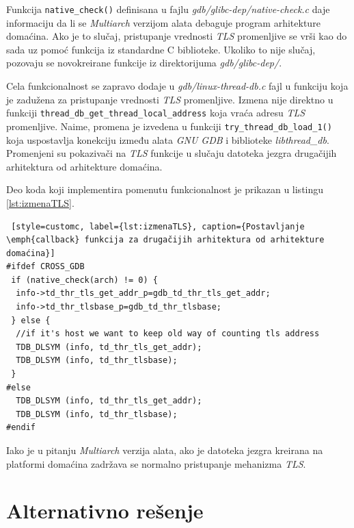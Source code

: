 \documentclass[12pt,oneside]{memoir}
\begin{document}
Funkcija \texttt{native\_check()} definisana u fajlu \emph{gdb/glibc-dep/native-check.c} daje informaciju da li se \emph{Multiarch} verzijom alata debaguje program arhitekture domaćina. Ako je to slučaj, pristupanje vrednosti \emph{TLS} promenljive se vrši kao do sada uz pomoć funkcija iz standardne C biblioteke. Ukoliko to nije slučaj, pozovaju se novokreirane funkcije iz direktorijuma \emph{gdb/glibc-dep/}.

Cela funkcionalnost se zapravo dodaje u \emph{gdb/linux-thread-db.c} fajl u funkciju koja je zadužena za pristupanje vrednosti \emph{TLS} promenljive. Izmena nije direktno u funkciji \texttt{thread\_db\_get\_thread\_local\_address} koja vraća adresu \emph{TLS} promenljive. Naime, promena je izvedena u funkciji \texttt{try\_thread\_db\_load\_1()} koja uspostavlja konekciju između alata \emph{GNU GDB} i biblioteke \emph{libthread\_db}. Promenjeni su pokazivači na \emph{TLS} funkcije u slučaju datoteka jezgra drugačijih arhitektura od arhitekture domaćina.

Deo koda koji implementira pomenutu funkcionalnost je prikazan u listingu \ref{lst:izmenaTLS}.
\begin{lstlisting} [style=customc, label={lst:izmenaTLS}, caption={Postavljanje \emph{callback} funkcija za drugačijih arhitektura od arhitekture domaćina}]
#ifdef CROSS_GDB
 if (native_check(arch) != 0) {
  info->td_thr_tls_get_addr_p=gdb_td_thr_tls_get_addr;
  info->td_thr_tlsbase_p=gdb_td_thr_tlsbase;
 } else {
  //if it's host we want to keep old way of counting tls address
  TDB_DLSYM (info, td_thr_tls_get_addr);
  TDB_DLSYM (info, td_thr_tlsbase);
 }
#else
  TDB_DLSYM (info, td_thr_tls_get_addr);
  TDB_DLSYM (info, td_thr_tlsbase);
#endif
\end{lstlisting}
Iako je u pitanju \emph{Multiarch} verzija alata, ako je datoteka jezgra kreirana na  platformi domaćina zadržava se normalno pristupanje mehanizma \emph{TLS}.

\section{Alternativno rešenje}
\end{document}
